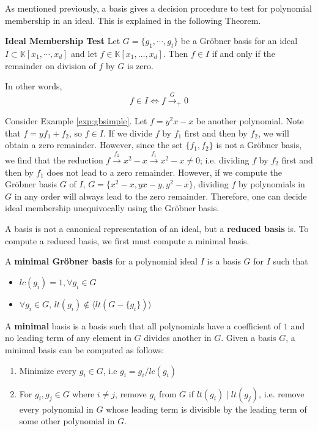 As mentioned previously, a \Grobner basis gives a decision procedure to test 
for polynomial membership in an ideal. This is explained in the following 
Theorem.
    
\begin{Theorem}\label{the:membership}
	{\bf Ideal Membership Test}
 Let $G = \{g_1,\cdots,g_t \}$ be a Gr\"obner basis for an ideal $I \subset \mathbb{K}[x_1,\cdots,x_d ]$
	and let $f \in \mathbb{K}[x_{1},\dots, x_{d}]$. Then $f \in I$ if and only if the remainder on division of $f$ by
	$G$ is zero.
\end{Theorem}
In other words, 
\begin{equation}
f \in I \iff f \stackrel{G}{\textstyle\longrightarrow}_+0
\end{equation}

\begin{Example}
Consider Example \ref{exp:gbsimple}. Let $f = y^2x - x$ be another
polynomial. Note that $f = yf_1 + f_2$, so $f \in I$. If we divide $f$
by $f_1$ first and then by $f_2$, we will obtain a zero
remainder. However, since the set $\{f_1, f_2\}$ is not a Gr\"{o}bner
basis, we find that the reduction $f
\stackrel{f_2}{\textstyle\longrightarrow} x^2 - x
\stackrel{f_1}{\textstyle\longrightarrow} x^2 - x  \neq 0$;
i.e. dividing $f$ by $f_2$ first and then by $f_1$ does not lead to a
zero remainder. However,  if we compute the Gr\"{o}bner basis $G$ of
$I$, $G = \{x^2 - x, yx - y, y^2 - x\}$, dividing $f$ by polynomials
in $G$ in any order will always lead to the zero remainder. Therefore,
one can decide ideal membership unequivocally using the Gr\"{o}bner
basis. 
\end{Example}

A \Grobner basis is not a canonical representation of an ideal, but a
{\bf reduced \Grobner basis} is. To compute a reduced \Grobner basis, we
first must compute a minimal \Grobner basis.

\begin{Definition}\label{def:minigb}
A {\bf minimal Gr\"obner basis} for a polynomial ideal $I$ is a \Grobner basis $G$ for $I$ such that
	\begin{itemize}
		\item $lc(g_{i})=1,\forall g_{i}\in G$
		\item $\forall g_{i} \in G$,  $lt(g_{i}) \notin \langle lt(G-\{g_{i}\})\rangle$
	\end{itemize}
\end{Definition}
A {\bf minimal} \Grobner basis is a \Grobner basis such that all polynomials
have a coefficient of $1$ and no leading term of any element in $G$ divides 
another in $G$.
Given a \Grobner basis $G$, a minimal \Grobner basis can be
computed as follows:
\begin{enumerate}
\item Minimize every $g_i \in G$, i.e $g_i=g_i/lc(g_i)$
\item For $g_i, g_j \in G$ where $i\neq j$, remove $g_i$ from $G$ if $lt(g_i)\mid lt(g_j)$, i.e. remove every polynomial in $G$ whose leading term is divisible by the leading term of some other polynomial in $G$.
\end{enumerate}


